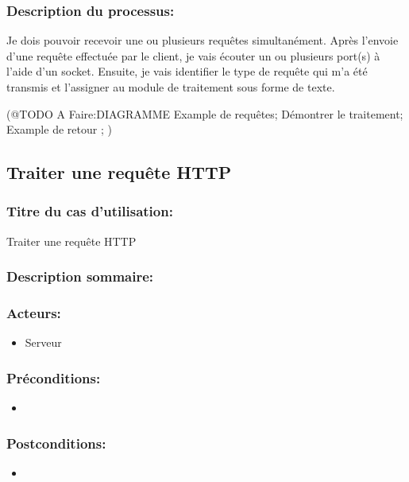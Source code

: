 \documentclass{scrreprt}
\begin{document}
\subsubsection{Description du processus:}
Je dois pouvoir recevoir une ou plusieurs requêtes simultanément. Après l'envoie d'une requête effectuée par le client, je vais écouter un ou plusieurs port(s) à l'aide d'un socket. Ensuite, je vais identifier le type de requête qui m'a été transmis et l'assigner au module de traitement sous forme de texte.

(@TODO A Faire:DIAGRAMME
Example de requêtes;
Démontrer le traitement;
Example de retour ;
)

\subsection{Traiter une requête HTTP}
\subsubsection{Titre du cas d'utilisation:} Traiter une requête HTTP
\subsubsection{Description sommaire:} 
\subsubsection{Acteurs:}
\begin{itemize}
    \item Serveur
\end{itemize}
\subsubsection{Préconditions:}
\begin{itemize}
    \item  
\end{itemize} 
\subsubsection{Postconditions:}
\begin{itemize}
    \item  
\end{itemize} 
\end{document}
